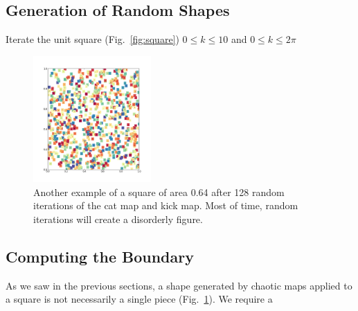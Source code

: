 \documentclass[12pt]{article}
\begin{document}
\subsection{Generation of Random Shapes}
Iterate the unit square (Fig.~\ref{fig:square}) $0 \leq k \leq 10$ and $0 \leq k \leq 2\pi$
\begin{figure}[t]
  \centering
  \includegraphics[width=0.4\textwidth]{chaotic_shape}
  \caption{Another example of a square of area 0.64 after 128 random iterations of the cat map and kick map.
  Most of time, random iterations will create a disorderly figure.
  }
  \label{fig:chaotic}
\end{figure}

\subsection{Computing the Boundary}
As we saw in the previous sections, a shape generated by chaotic maps applied to a square is not necessarily a single piece (Fig.~\ref{fig:chaotic}).
We require a 
\end{document}
